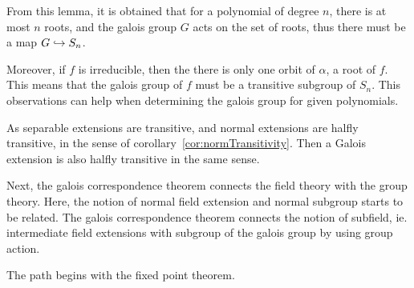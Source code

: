\documentclass{article}
\begin{document}
  From this lemma, it is obtained that for a polynomial of degree $n$, there is at most $n$ roots, and the 
  galois group $G$ acts on the set of roots, thus there must be a map $G \hookrightarrow S_n$.

  Moreover, if $f$ is irreducible, then the there is only one orbit of $\alpha$, a root of $f$. This means that the galois group 
  of $f$ must be a transitive subgroup of $S_n$. This observations can help when determining the galois group for given polynomials.

  As separable extensions are transitive, and normal extensions are halfly transitive, in the sense of 
  corollary~\ref{cor:normTransitivity}. Then a Galois extension is also halfly transitive in the same sense.

  Next, the galois correspondence theorem connects the field theory with the group theory. Here, the notion of normal field extension 
  and normal subgroup starts to be related. The galois correspondence theorem connects the notion of subfield, ie. 
  intermediate field extensions with subgroup of the galois group by using group action.

  The path begins with the fixed point theorem.

\end{document}
